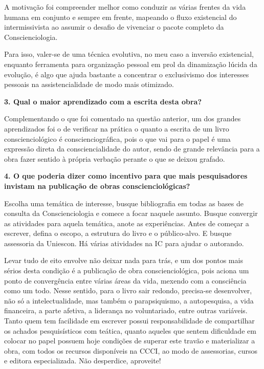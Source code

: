 \documentclass{gescons}
\begin{document}
\begin{multicols}{2}
A motivação foi compreender melhor como conduzir as várias frentes da vida humana em conjunto e sempre em frente, mapeando o fluxo existencial do intermissivista ao assumir o desafio de vivenciar o pacote completo da Conscienciologia.

Para isso, valer-se de uma técnica evolutiva, no meu caso a inversão existencial, enquanto ferramenta para organização pessoal em prol da dinamização lúcida da evolução, é algo que ajuda bastante a concentrar o exclusivismo dos interesses pessoais na assistencialidade de modo mais otimizado.



\textbf{3.       Qual o maior aprendizado com a escrita desta obra?}

Complementando o que foi comentado na questão anterior, um dos grandes aprendizados foi o de verificar na prática o quanto a escrita de um livro conscienciológico é conscienciográfica, pois o que vai para o papel é uma expressão direta da consciencialidade do autor, sendo de grande relevância para a obra fazer sentido à própria verbação perante o que se deixou grafado.


\textbf{4.       O que poderia dizer como incentivo para que mais pesquisadores invistam na publicação de obras conscienciológicas?}

Escolha uma temática de interesse, busque bibliografia em todas as bases de consulta da Conscienciologia e comece a focar naquele assunto. Busque convergir as atividades para aquela temática, anote as experiências. Antes de começar a escrever, defina o escopo, a estrutura do livro e o público-alvo. E busque assessoria da Uniescon. Há várias atividades na IC para ajudar o autorando. 
    
Levar tudo de eito envolve não deixar nada para trás, e um dos pontos mais sérios desta condição é a publicação de obra conscienciológica, pois aciona um ponto de convergência entre várias áreas da vida, mexendo com a consciência como um todo. Nesse sentido, para o livro sair redondo, precisa-se desenvolver, não só a intelectualidade, mas também o parapsiquismo, a autopesquisa, a vida financeira, a parte afetiva, a liderança no voluntariado, entre outras variáveis. Tanto quem tem facilidade em escrever possui responsabilidade de compartilhar os achados pesquisísticos com teática, quanto aqueles que sentem dificuldade em colocar no papel possuem hoje condições de superar este travão e materializar a obra, com todos os recursos disponíveis na CCCI, ao modo de assessorias, cursos e editora especializada. Não desperdice, aproveite!

    \end{multicols}
\end{document}
